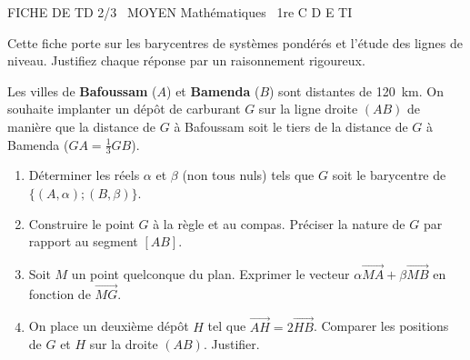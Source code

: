 \documentclass[11pt]{article}
\begin{document}
\begin{tcolorbox}[enhanced,colback=popink,colframe=popink,arc=10pt,boxrule=0pt,left=12pt,right=12pt,top=9pt,bottom=9pt]
{\color{white}\popxbold\small FICHE DE TD 2/3 \textbullet\ MOYEN \hfill Mathématiques \textbullet\ 1re C D E TI\par}
\end{tcolorbox}
\vspace{4pt}
Cette fiche porte sur les barycentres de systèmes pondérés et l'étude des lignes de niveau. Justifiez chaque réponse par un raisonnement rigoureux.

\begin{exercice}
Les villes de \textbf{Bafoussam} ($A$) et \textbf{Bamenda} ($B$) sont distantes de \SI{120}{km}. On souhaite implanter un dépôt de carburant $G$ sur la ligne droite $(AB)$ de manière que la distance de $G$ à Bafoussam soit le tiers de la distance de $G$ à Bamenda ($GA = \frac{1}{3} GB$).
\begin{enumerate}
    \item Déterminer les réels $\alpha$ et $\beta$ (non tous nuls) tels que $G$ soit le barycentre de $\{(A,\alpha);(B,\beta)\}$.
    \item Construire le point $G$ à la règle et au compas. Préciser la nature de $G$ par rapport au segment $[AB]$.
    \item Soit $M$ un point quelconque du plan. Exprimer le vecteur $\alpha\overrightarrow{MA}+\beta\overrightarrow{MB}$ en fonction de $\overrightarrow{MG}$.
    \item On place un deuxième dépôt $H$ tel que $\overrightarrow{AH} = 2\overrightarrow{HB}$. Comparer les positions de $G$ et $H$ sur la droite $(AB)$. Justifier.
\end{enumerate}
\end{exercice}
\end{document}
